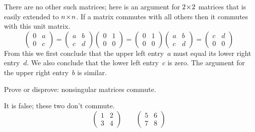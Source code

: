 \begin{exercises}
\begin{answer}
      There are no other such matrices; here is an argument for $2 \! \times \! 2$ 
      matrices that is easily extended to $n \! \times \! n$.
      If a matrix commutes with all others then it commutes with this
      unit matrix.
      \begin{equation*}
        \begin{pmatrix}
          0  &a  \\
          0  &c 
        \end{pmatrix}
        =\begin{pmatrix}
          a  &b  \\
          c  &d   
        \end{pmatrix}
        \begin{pmatrix}
          0  &1  \\
          0  &0
        \end{pmatrix}
        =\begin{pmatrix}
          0  &1  \\
          0  &0
        \end{pmatrix}
        \begin{pmatrix}
          a  &b  \\
          c  &d   
        \end{pmatrix}
        =\begin{pmatrix}
          c  &d  \\
          0  &0 
        \end{pmatrix}
      \end{equation*}
      From this we first conclude that the upper left entry~$a$ 
      must equal its lower right entry~$d$.
      We also conclude that the lower left entry~$c$ is zero.
      The argument for the upper right entry~$b$ is similar.
    \end{answer}
  \item 
    Prove or disprove: nonsingular matrices commute.
    \begin{answer}
      It is false; these two don't commute.
      \begin{equation*}
         \begin{pmatrix}
           1  &2  \\
           3  &4
         \end{pmatrix}
         \qquad
         \begin{pmatrix}
           5  &6  \\
           7  &8
         \end{pmatrix}
      \end{equation*}  

\end{answer}
\end{exercises}
